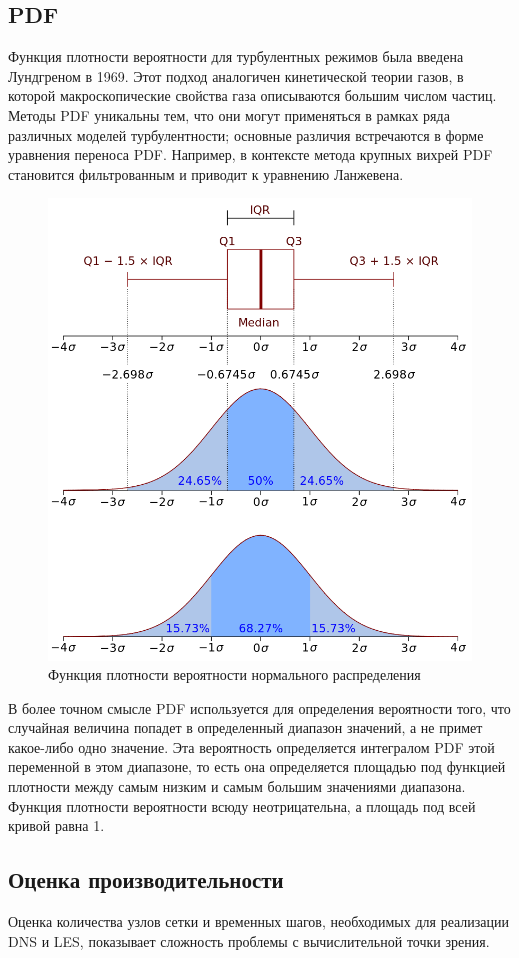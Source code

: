 \subsection{PDF}
	Функция плотности вероятности для турбулентных режимов была введена Лундгреном в 1969\cite{Lundgren1969}. Этот подход аналогичен кинетической теории газов, в которой макроскопические свойства газа описываются большим числом частиц. Методы PDF уникальны тем, что они могут применяться в рамках ряда различных моделей турбулентности; основные различия встречаются в форме уравнения переноса PDF. Например, в контексте метода крупных вихрей PDF становится фильтрованным и приводит к уравнению Ланжевена.
	\begin{figure}[H]
		\centering
		\includegraphics[width=0.7\linewidth]{../Assets/pdfplot}
		\caption{Функция плотности вероятности нормального распределения}
		\label{fig:pdfplot}
	\end{figure}
	В более точном смысле PDF используется для определения вероятности того, что случайная величина попадет в определенный диапазон значений, а не примет какое-либо одно значение. Эта вероятность определяется интегралом PDF этой переменной в этом диапазоне, то есть она определяется площадью под функцией плотности между самым низким и самым большим значениями диапазона. Функция плотности вероятности всюду неотрицательна, а площадь под всей кривой равна 1.
\subsection{Оценка производительности}
	
	Оценка количества узлов сетки и временных шагов, необходимых для реализации DNS и LES, показывает сложность проблемы с вычислительной точки зрения.
	
